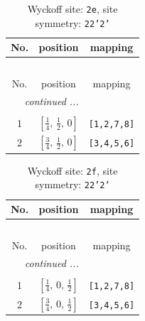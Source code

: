 \documentclass[fleqn,8pt]{jsarticle}
\begin{document}
\begin{longtable}{ccc}
\caption{Wyckoff site: {\tt 2e}, site symmetry: {\tt 22'2'}}
 \\
 \hline \hline
No. & position & mapping \\ \hline \endfirsthead

\multicolumn{2}{l}{\tablename\ \thetable{}} \\
 \hline \hline
No. & position & mapping \\ \hline \endhead

 \hline \hline
\multicolumn{2}{r}{\footnotesize\it continued ...} \\ \endfoot

 \hline \hline
\multicolumn{2}{r}{} \\ \endlastfoot

1 & $\left[ \frac{1}{4},\, \frac{1}{2},\, 0 \right]$ & {\tt [1,2,7,8]} \\ \hline
2 & $\left[ \frac{3}{4},\, \frac{1}{2},\, 0 \right]$ & {\tt [3,4,5,6]} \\
\end{longtable}
\renewcommand{\arraystretch}{1.2}
\begin{longtable}{ccc}
\caption{Wyckoff site: {\tt 2f}, site symmetry: {\tt 22'2'}}
 \\
 \hline \hline
No. & position & mapping \\ \hline \endfirsthead

\multicolumn{2}{l}{\tablename\ \thetable{}} \\
 \hline \hline
No. & position & mapping \\ \hline \endhead

 \hline \hline
\multicolumn{2}{r}{\footnotesize\it continued ...} \\ \endfoot

 \hline \hline
\multicolumn{2}{r}{} \\ \endlastfoot

1 & $\left[ \frac{1}{4},\, 0,\, \frac{1}{2} \right]$ & {\tt [1,2,7,8]} \\ \hline
2 & $\left[ \frac{3}{4},\, 0,\, \frac{1}{2} \right]$ & {\tt [3,4,5,6]} \\
\end{longtable}
\renewcommand{\arraystretch}{1.2}
\end{document}
